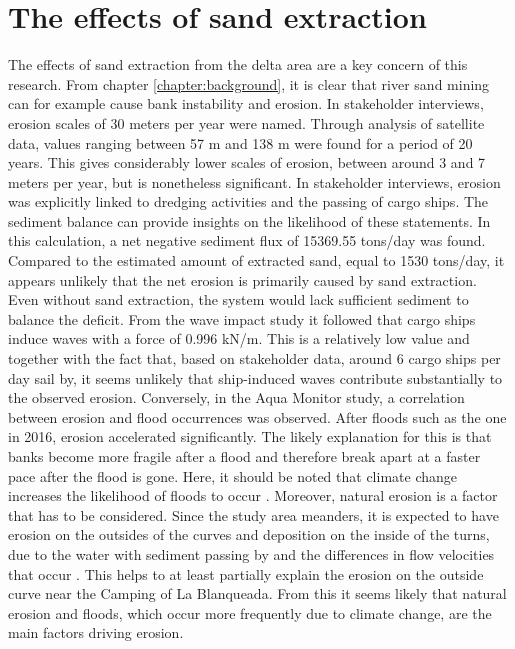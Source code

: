 \section{The effects of sand extraction}
The effects of sand extraction from the delta area are a key concern of this research. From chapter \ref{chapter:background}, it is clear that river sand mining can for example cause bank instability and erosion. In stakeholder interviews, erosion scales of 30 meters per year were named. Through analysis of satellite data, values ranging between 57 m and 138 m were found for a period of 20 years. This gives considerably lower scales of erosion, between around 3 and 7 meters per year, but is nonetheless significant. In stakeholder interviews, erosion was explicitly linked to dredging activities and the passing of cargo ships. The sediment balance can provide insights on the likelihood of these statements. In this calculation, a net negative sediment flux of 15369.55 tons/day was found. Compared to the estimated amount of extracted sand, equal to 1530 tons/day, it appears unlikely that the net erosion is primarily caused by sand extraction. Even without sand extraction, the system would lack sufficient sediment to balance the deficit. From the wave impact study it followed that cargo ships induce waves with a force of 0.996 kN/m. This is a relatively low value and together with the fact that, based on stakeholder data, around 6 cargo ships per day sail by, it seems unlikely that ship-induced waves contribute substantially to the observed erosion. Conversely, in the Aqua Monitor study, a correlation between erosion and flood occurrences was observed. After floods such as the one in 2016, erosion accelerated significantly. The likely explanation for this is that banks become more fragile after a flood and therefore break apart at a faster pace after the flood is gone. Here, it should be noted that climate change increases the likelihood of floods to occur \autocite{usenvironmentalprotectionagencyClimateChangeIndicators2016}. Moreover, natural erosion is a factor that has to be considered. Since the study area meanders, it is expected to have erosion on the outsides of the curves and deposition on the inside of the turns, due to the water with sediment passing by and the differences in flow velocities that occur \autocite{niWhyRiversCurve2025}. This helps to at least partially explain the erosion on the outside curve near the Camping of La Blanqueada. From this it seems likely that natural erosion and floods, which occur more frequently due to climate change, are the main factors driving erosion.

